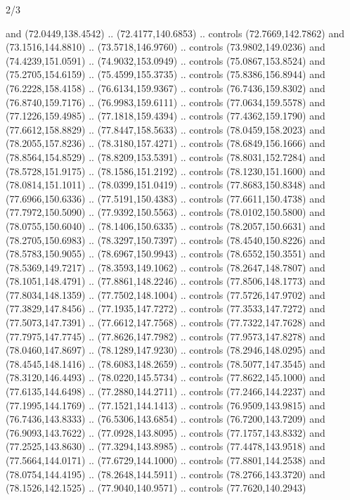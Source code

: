 \begin{flagdescription}{2/3}
\begin{scope}[shift={(0.5\flaglength,0.5)},scale=\flagwidth/320]
\begin{scope}[y=0.8pt, x=0.8pt, yscale=-1,shift={(-118.3,-146)}]
  and (72.0449,138.4542) .. (72.4177,140.6853) .. controls (72.7669,142.7862)
  and (73.1516,144.8810) .. (73.5718,146.9760) .. controls (73.9802,149.0236)
  and (74.4239,151.0591) .. (74.9032,153.0949) .. controls (75.0867,153.8524)
  and (75.2705,154.6159) .. (75.4599,155.3735) .. controls (75.8386,156.8944)
  and (76.2228,158.4158) .. (76.6134,159.9367) .. controls (76.7436,159.8302)
  and (76.8740,159.7176) .. (76.9983,159.6111) .. controls (77.0634,159.5578)
  and (77.1226,159.4985) .. (77.1818,159.4394) .. controls (77.4362,159.1790)
  and (77.6612,158.8829) .. (77.8447,158.5633) .. controls (78.0459,158.2023)
  and (78.2055,157.8236) .. (78.3180,157.4271) .. controls (78.6849,156.1666)
  and (78.8564,154.8529) .. (78.8209,153.5391) .. controls (78.8031,152.7284)
  and (78.5728,151.9175) .. (78.1586,151.2192) .. controls (78.1230,151.1600)
  and (78.0814,151.1011) .. (78.0399,151.0419) .. controls (77.8683,150.8348)
  and (77.6966,150.6336) .. (77.5191,150.4383) .. controls (77.6611,150.4738)
  and (77.7972,150.5090) .. (77.9392,150.5563) .. controls (78.0102,150.5800)
  and (78.0755,150.6040) .. (78.1406,150.6335) .. controls (78.2057,150.6631)
  and (78.2705,150.6983) .. (78.3297,150.7397) .. controls (78.4540,150.8226)
  and (78.5783,150.9055) .. (78.6967,150.9943) .. controls (78.6552,150.3551)
  and (78.5369,149.7217) .. (78.3593,149.1062) .. controls (78.2647,148.7807)
  and (78.1051,148.4791) .. (77.8861,148.2246) .. controls (77.8506,148.1773)
  and (77.8034,148.1359) .. (77.7502,148.1004) .. controls (77.5726,147.9702)
  and (77.3829,147.8456) .. (77.1935,147.7272) .. controls (77.3533,147.7272)
  and (77.5073,147.7391) .. (77.6612,147.7568) .. controls (77.7322,147.7628)
  and (77.7975,147.7745) .. (77.8626,147.7982) .. controls (77.9573,147.8278)
  and (78.0460,147.8697) .. (78.1289,147.9230) .. controls (78.2946,148.0295)
  and (78.4545,148.1416) .. (78.6083,148.2659) .. controls (78.5077,147.3545)
  and (78.3120,146.4493) .. (78.0220,145.5734) .. controls (77.8622,145.1000)
  and (77.6135,144.6498) .. (77.2880,144.2711) .. controls (77.2466,144.2237)
  and (77.1995,144.1769) .. (77.1521,144.1413) .. controls (76.9509,143.9815)
  and (76.7436,143.8333) .. (76.5306,143.6854) .. controls (76.7200,143.7209)
  and (76.9093,143.7622) .. (77.0928,143.8095) .. controls (77.1757,143.8332)
  and (77.2525,143.8630) .. (77.3294,143.8985) .. controls (77.4478,143.9518)
  and (77.5664,144.0171) .. (77.6729,144.1000) .. controls (77.8801,144.2538)
  and (78.0754,144.4195) .. (78.2648,144.5911) .. controls (78.2766,143.3720)
  and (78.1526,142.1525) .. (77.9040,140.9571) .. controls (77.7620,140.2943)

\end{scope}
\end{scope}
\end{flagdescription}
